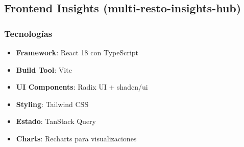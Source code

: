 \documentclass[12pt,a4paper]{article}
\begin{document}
\subsection{Frontend Insights (multi-resto-insights-hub)}

\subsubsection{Tecnologías}
\begin{itemize}
    \item \textbf{Framework}: React 18 con TypeScript
    \item \textbf{Build Tool}: Vite
    \item \textbf{UI Components}: Radix UI + shadcn/ui
    \item \textbf{Styling}: Tailwind CSS
    \item \textbf{Estado}: TanStack Query
    \item \textbf{Charts}: Recharts para visualizaciones
\end{itemize}
\end{document}
